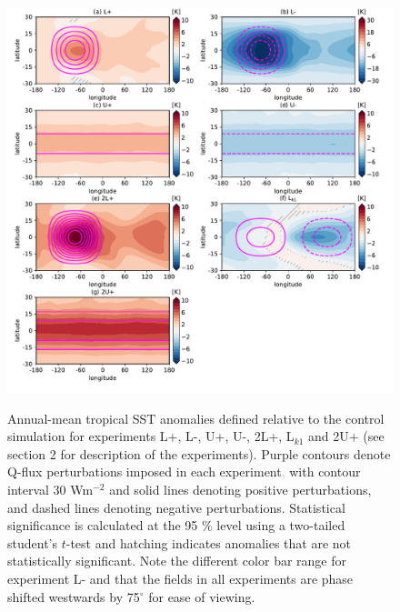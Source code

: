 \documentclass[draft]{agujournal2019}
\newcommand{\cledit}[1]{{\textcolor{violet}{#1}}}
\begin{document}
\newpage
\begin{figure}[ht]
  \noindent\includegraphics[trim=0cm 0cm 0cm 0cm, clip=true,scale=0.6]{./fig_01.pdf}\\
  \caption{Annual-mean tropical SST anomalies defined relative to the control simulation for experiments L+, L-, U+, U-, 2L+, L$_{k1}$ and 2U+ (see section 2 for description of the experiments). Purple contours denote Q-flux perturbations imposed in each experiment\cledit{,} with contour interval 30 Wm$^{-2}$ and solid lines denoting positive perturbations, and dashed lines denoting negative perturbations. Statistical significance is calculated at the 95 $\%$ level using a two-tailed student's $t$-test and hatching indicates anomalies that are not statistically significant. Note the different color bar range for experiment L- and that the fields in all experiments are phase shifted westwards by 75$^{\circ}$ for ease of viewing.}\label{f1}
\end{figure}
\end{document}
